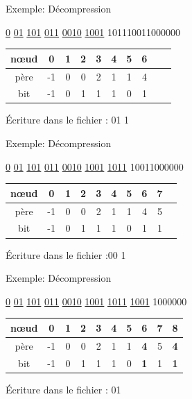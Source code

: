\documentclass[french]{beamer}
\begin{document}
\begin{frame}{Exemple: Décompression}
\begin{center}
\underline{0} \underline{01} \underline{101} \underline{011} \underline{0010} \underline{1001} 101110011000000
\end{center}

	\begin{center}
	\begin{tabular}{|c|c|c|c|c|c|c|c|c|c|}
	\hline
	nœud & 0 & 1 & 2 & 3 & 4 & 5 & 6 \\
	\hline
	père & -1 & 0 & 0 & 2 & 1 & 1 & 4  \\
	\hline
	bit & -1 & 0 & 1 & 1 & 1 & 0 & 1 \\
	\hline 
	\end{tabular}
	\end{center}
	\begin{center}
	Écriture dans le fichier : 01 1
	\end{center}
\end{frame}

\begin{frame}{Exemple: Décompression}
\begin{center}
\underline{0} \underline{01} \underline{101} \underline{011} \underline{0010} \underline{1001} \underline{1011} 10011000000
\end{center}

	\begin{center}
	\begin{tabular}{|c|c|c|c|c|c|c|c|c|c|}
	\hline
	nœud & 0 & 1 & 2 & 3 & 4 & 5 & 6 & 7 \\
	\hline
	père & -1 & 0 & 0 & 2 & 1 & 1 & 4 & 5  \\
	\hline
	bit & -1 & 0 & 1 & 1 & 1 & 0 & 1 & 1 \\
	\hline 
	\end{tabular}
	\end{center}
	\begin{center}
	Écriture dans le fichier :00  1
	\end{center}
\end{frame}

\begin{frame}{Exemple: Décompression}
\begin{center}
\underline{0} \underline{01} \underline{101} \underline{011} \underline{0010} \underline{1001} \underline{1011} \underline{1001} 1000000
\end{center}

\begin{center}
	\begin{tabular}{|c|c|c|c|c|c|c|c|c|c|}
	\hline
	nœud & 0 & 1 & 2 & 3 & 4 & 5 & 6 & 7 & 8 \\
	\hline
	père & -1 & 0 & 0 & 2 & 1 & 1 & \textbf{4} & 5 & \textbf{4} \\
	\hline
	bit & -1 & 0 & 1 & 1 & 1 & 0 & \textbf{1} & 1 & \textbf{1} \\
	\hline 
	\end{tabular}
	\end{center}
	\begin{center}
	Écriture dans le fichier : 01
	\end{center}
\end{frame}
\end{document}
